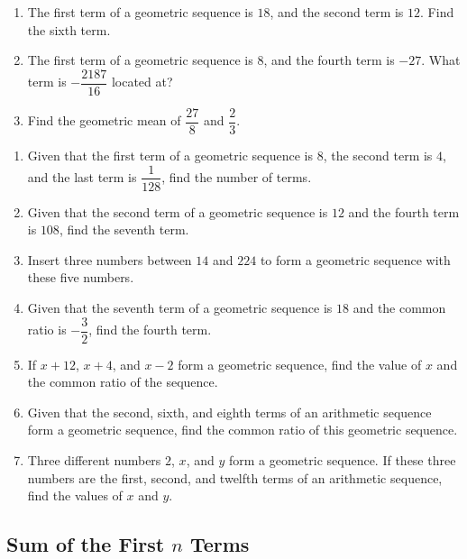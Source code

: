 \documentclass{report}
\begin{document}
        \begin{enumerate}
            \item The first term of a geometric sequence is $18$, and the second term is $12$. Find the sixth term.

            \item The first term of a geometric sequence is $8$, and the fourth term is $-27$. What term is $-\dfrac{2187}{16}$ located at?
            
            \item Find the geometric mean of $\dfrac{27}{8}$ and $\dfrac{2}{3}$.
        \end{enumerate}

        \begin{enumerate}
            \item Given that the first term of a geometric sequence is $8$, the second term is $4$, and the last term is $\dfrac{1}{128}$, find the number of terms.

            \item  Given that the second term of a geometric sequence is $12$ and the fourth term is $108$, find the seventh term.
            
            \item Insert three numbers between $14$ and $224$ to form a geometric sequence with these five numbers.
            
            \item Given that the seventh term of a geometric sequence is $18$ and the common ratio is $-\dfrac{3}{2}$, find the fourth term.
            
            \item If $x+12$, $x+4$, and $x-2$ form a geometric sequence, find the value of $x$ and the common ratio of the sequence.
            
            \item Given that the second, sixth, and eighth terms of an arithmetic sequence form a geometric sequence, find the common ratio of this geometric sequence.
            
            \item Three different numbers $2$, $x$, and $y$ form a geometric sequence. If these three numbers are the first, second, and twelfth terms of an arithmetic sequence, find the values of $x$ and $y$.
        \end{enumerate}

        \subsection*{Sum of the First \(n\) Terms}
\end{document}
